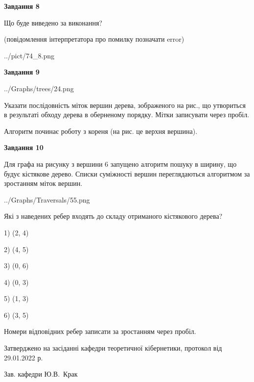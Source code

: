 \documentclass[12pt, ukrainian]{article}
\begin{document}
{\begin {large}
{\begin {center}\textbf{Завдання 8}\end {center}}\par
Що буде виведено за виконання?\par
 (повідомлення інтерпретатора про помилку позначати error)\par
\begin{center}
	{../pict/74_8.png}
\end{center}
\newpage

{\begin {center}\textbf{Завдання 9}\end {center}}\par

\begin{center}
	{../Graphs/trees/24.png}
\end{center}
Указати послідовність міток вершин дерева, зображеного на рис., що утвориться в результаті обходу дерева в оберненому порядку. Мітки записувати через пробіл.\par Алгоритм починає роботу з кореня (на рис. це верхня вершина).\par
\newpage

{\begin {center}\textbf{Завдання 10}\end {center}}\par
Для графа на рисунку з вершини 6 запущено алгоритм пошуку в ширину, що будує кістякове дерево. Списки суміжності вершин переглядаються алгоритмом за зростанням міток вершин.\par
\begin{center}
	{../Graphs/Traversals/55.png}
\end{center}
\par Які з наведених ребер входять до складу отриманого кістякового дерева?\par
1) (2, 4)\par
2) (4, 5)\par
3) (0, 6)\par
4) (0, 3)\par
5) (1, 3)\par
6) (3, 5)\par
{\vskip 15pt} Номери відповідних ребер записати за зростанням через пробіл.\par
\newpage


\end {large}
}
{\smallskip \begin {small} Затверджено на засіданні кафедри теоретичної кібернетики, протокол  від   29.01.2022 р.\par\smallskip\smallskip
{\parbox {6.5 cm}{Зав. кафедри \dotfill Ю.В.~Крак}} \end{small}}
\end{document}
